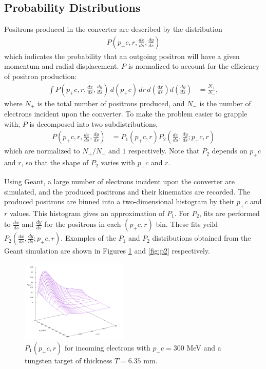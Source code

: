 \documentclass[letter,
               biblatex,     %
               keeplastbox,   %
               ]{jacow}
\newcommand{\dxds}{\frac{dx}{ds}}
\newcommand{\dyds}{\frac{dy}{ds}}
\begin{document}
\subsection{Probability Distributions}

Positrons produced in the converter are described by the distribution
\begin{align}
P \left( p_+ c, r, \dxds, \dyds \right)
\end{align}
which indicates the probability that an outgoing positron will have a given momentum and radial displacement.
$P$ is normalized to account for the efficiency of positron production:
\begin{align}
\int P \left( p_+ c, r, \dxds, \dyds \right) \, d(p_+ c) \, dr \, d \! \left( \dxds \right) d \! \left( \dyds \right) & = \frac{N_+}{N_-},
\end{align}
where $N_+$ is the total number of positrons produced, and $N_-$ is the number of electrons incident upon the converter.
To make the problem easier to grapple with, $P$ is decomposed into two subdistributions,
\begin{align}
P \left( p_+ c, r, \dxds, \dyds \right) & = P_1 \left( p_+ c, r \right) P_2 \left( \dxds, \dyds ; p_+ c, r \right)
\end{align}
which are normalized to $N_+/N_-$ and $1$ respectively.
Note that $P_2$ depends on $p_+ c$ and $r$, so that the shape of $P_2$ varies with $p_+ c$ and $r$.

Using Geant\cite{geant}, a large number of electrons incident upon the converter are simulated, and the produced positrons and their kinematics are recorded.
The produced positrons are binned into a two-dimensional histogram by their $p_+ c$ and $r$ values.
This histogram gives an approximation of $P_1$.
For $P_2$, fits are performed to $\dxds$ and $\dyds$ for the positrons in each $(p_+c, r)$ bin.
These fits yeild $P_2 \left( \dxds, \dyds ; p_+ c, r \right)$.
Examples of the $P_1$ and $P_2$ distributions obtained from the Geant simulation are shown in Figures \ref{fig:p1} and \ref{fig:p2} respectively.

\begin{figure}
\centering
\includegraphics[width=0.45\textwidth]{p1}
\caption{$P_1(p_+ c, r)$ for incoming electrons with $p_- c = 300$ MeV and a tungsten target of thickness $T = 6.35$ mm.}
\label{fig:p1}
\end{figure}
\end{document}
